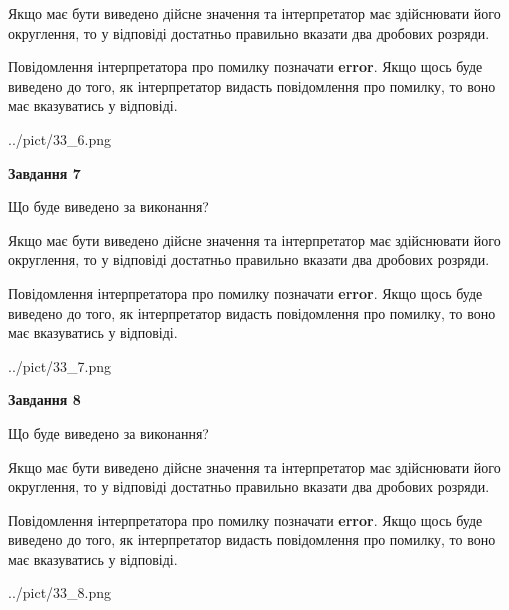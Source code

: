 \documentclass[12pt, ukrainian]{article}
\begin{document}
{\begin {Large}
Якщо має бути виведено дійсне значення та інтерпретатор має здійснювати його округлення, 
то у відповіді достатньо правильно вказати два дробових розряди.

Повідомлення інтерпретатора про помилку позначати \textbf{error}.
Якщо щось буде виведено до того, як інтерпретатор видасть повідомлення про помилку, 
то воно має вказуватись у відповіді. \par

\begin{center}
	{../pict/33_6.png}
\end{center}
\newpage

{\begin {center}\textbf{Завдання 7}\end {center}}\par
Що буде виведено за виконання? \par

Якщо має бути виведено дійсне значення та інтерпретатор має здійснювати його округлення, 
то у відповіді достатньо правильно вказати два дробових розряди.

Повідомлення інтерпретатора про помилку позначати \textbf{error}.
Якщо щось буде виведено до того, як інтерпретатор видасть повідомлення про помилку, 
то воно має вказуватись у відповіді. \par

\begin{center}
	{../pict/33_7.png}
\end{center}
\newpage

{\begin {center}\textbf{Завдання 8}\end {center}}\par
Що буде виведено за виконання? \par

Якщо має бути виведено дійсне значення та інтерпретатор має здійснювати його округлення, 
то у відповіді достатньо правильно вказати два дробових розряди.

Повідомлення інтерпретатора про помилку позначати \textbf{error}.
Якщо щось буде виведено до того, як інтерпретатор видасть повідомлення про помилку, 
то воно має вказуватись у відповіді. \par

\begin{center}
	{../pict/33_8.png}
\end{center}
\newpage


\end{Large}}
\end{document}
